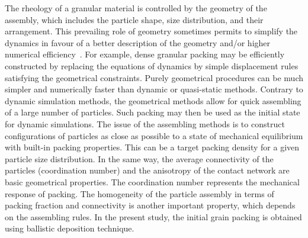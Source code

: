The rheology of a granular material is controlled by the geometry of the 
assembly, which includes 
the particle shape, size distribution, and their arrangement. This prevailing 
role of geometry 
sometimes permits to simplify the dynamics in favour of a better description of 
the geometry 
and/or 
higher numerical efficiency~\citep{Radjai2011}. For example, dense granular 
packing may be 
efficiently constructed by replacing the equations of dynamics by simple 
displacement rules 
satisfying the geometrical constraints. Purely geometrical procedures can be 
much simpler and 
numerically faster than dynamic or quasi-static methods. Contrary to dynamic 
simulation methods, 
the geometrical methods allow for quick assembling of a large number of 
particles. Such packing 
may 
then be used as the initial state for dynamic simulations. The issue of the 
assembling methods is 
to construct configurations of particles as close as possible to a state of 
mechanical equilibrium 
with built-in packing properties. This can be a target packing density for a 
given particle size 
distribution. In the same way, the average connectivity of the particles 
(coordination number) and 
the anisotropy of the contact network are basic geometrical properties. The 
coordination number 
represents the mechanical response of packing. The homogeneity of the particle 
assembly in terms 
of 
packing fraction and connectivity is another important property, which depends 
on the assembling 
rules. In the present study, the initial grain packing is obtained using 
ballistic deposition 
technique.

